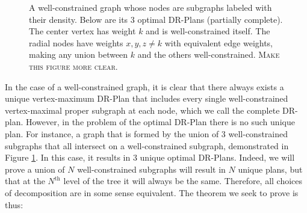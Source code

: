 \documentclass[11pt]{article}
\newcommand{\todo}[1]{\textsc{{\color{red}#1}}}
\newcommand{\tedge}[5]{\draw[#3] (#1)-- node[e, #5] (e#4) {#4} (#2)}
\begin{document}
\begin{figure}
\begin{center}


\end{center}

\caption{A well-constrained graph whose nodes are subgraphs labeled with their density. Below are its 3 optimal DR-Plans (partially complete). The center vertex has weight $k$ and is well-constrained itself. The radial nodes have weights $x,y,z \neq k$ with equivalent edge weights, making any union between $k$ and the others well-constrained. \todo{Make this figure more clear.}}
\label{3-plans}
\end{figure}

In the case of a well-constrained graph, it is clear that there always exists a unique vertex-maximum DR-Plan that includes every single well-constrained vertex-maximal proper subgraph at each node, which we call the complete DR-plan. However, in the problem of the optimal DR-Plan there is no such unique plan. For instance, a graph that is formed by the union of 3 well-constrained subgraphs that all intersect on a well-constrained subgraph, demonstrated in Figure \ref{3-plans}. In this case, it results in $3$ unique optimal DR-Plans. Indeed, we will prove a union of $N$ well-constrained subgraphs will result in $N$ unique plans, but that at the $N^{\text{th}}$ level of the tree it will always be the same. Therefore, all choices of decomposition are in some sense equivalent. The theorem we seek to prove is thus:
\end{document}

